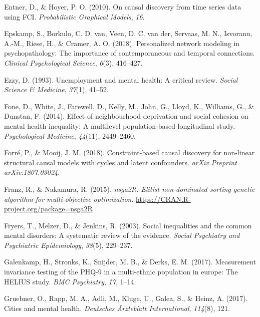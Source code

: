 \documentclass[
]{article}
\newlength{\cslhangindent}
\newenvironment{CSLReferences}[2] %
 {\begin{list}{}{%
  \setlength{\itemindent}{0pt}
  \setlength{\leftmargin}{0pt}
  \setlength{\parsep}{0pt}
  \ifodd #1
   \setlength{\leftmargin}{\cslhangindent}
   \setlength{\itemindent}{-1\cslhangindent}
  \fi
  \setlength{\itemsep}{#2\baselineskip}}}
 {\end{list}}
\begin{document}
\begin{CSLReferences}{1}{0}
Entner, D., \& Hoyer, P. O. (2010). On causal discovery from time series
data using FCI. \emph{Probabilistic Graphical Models}, \emph{16}.

Epskamp, S., Borkulo, C. D. van, Veen, D. C. van der, Servaas, M. N.,
Isvoranu, A.-M., Riese, H., \& Cramer, A. O. (2018). Personalized
network modeling in psychopathology: The importance of contemporaneous
and temporal connections. \emph{Clinical Psychological Science},
\emph{6}(3), 416--427.

Ezzy, D. (1993). Unemployment and mental health: A critical review.
\emph{Social Science \& Medicine}, \emph{37}(1), 41--52.

Fone, D., White, J., Farewell, D., Kelly, M., John, G., Lloyd, K.,
Williams, G., \& Dunstan, F. (2014). Effect of neighbourhood deprivation
and social cohesion on mental health inequality: A multilevel
population-based longitudinal study. \emph{Psychological Medicine},
\emph{44}(11), 2449--2460.

Forré, P., \& Mooij, J. M. (2018). Constraint-based causal discovery for
non-linear structural causal models with cycles and latent confounders.
\emph{arXiv Preprint arXiv:1807.03024}.

Franz, R., \& Nakamura, R. (2015). \emph{nsga2R: Elitist non-dominated
sorting genetic algorithm for multi-objective optimization}.
\url{https://CRAN.R-project.org/package=nsga2R}

Fryers, T., Melzer, D., \& Jenkins, R. (2003). Social inequalities and
the common mental disorders: A systematic review of the evidence.
\emph{Social Psychiatry and Psychiatric Epidemiology}, \emph{38}(5),
229--237.

Galenkamp, H., Stronks, K., Snijder, M. B., \& Derks, E. M. (2017).
Measurement invariance testing of the PHQ-9 in a multi-ethnic population
in europe: The HELIUS study. \emph{BMC Psychiatry}, \emph{17}, 1--14.

Gruebner, O., Rapp, M. A., Adli, M., Kluge, U., Galea, S., \& Heinz, A.
(2017). Cities and mental health. \emph{Deutsches {Ä}rzteblatt
International}, \emph{114}(8), 121.


\end{CSLReferences}
\end{document}
